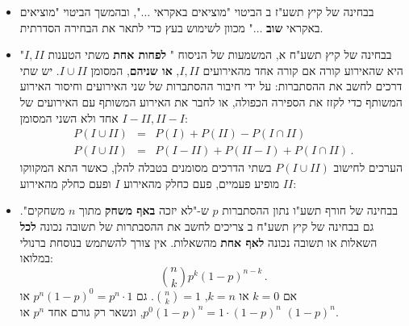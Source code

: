 \documentclass[12pt,a4paper]{article}
\newcommand{\bover}[1]{\bm{\overline{#1}}}
\begin{document}
\begin{itemize}
\item
בבחינה של קיץ תשע"ז ב הביטוי "מוציאים באקראי
$\ldots$",
ובהמשך הביטוי "מוציאים באקראי
\textbf{שוב}
$\ldots$"
מכוון לשימוש בעץ כדי לתאר את הבחירה הסדרתית.


\item
בבחינה של קיץ תשע"ח א, המשמעות של הניסוח "%
\textbf{לפחות אחת}
משתי הטענות 
$I, II$"
היא שהאירוע קורה אם קורה אחד מהאירועים
$I, II$,
\textbf{או שניהם},
המסומן 
$I \cup II$.
יש שתי דרכים לחשב את ההסתברות: על ידי חיבור ההסתברות של שני האירועים וחיסור האירוע המשותף כדי לקזז את הספירה הכפולה, או לחבר את האירוע המשותף עם האירועים של אחד ולא השני המסומן 
$I-II, II-I$:
\begin{eqnarray*}
P(I \cup II) &=& P(I) + P(II) - P(I \cap II)\\
P(I \cup II) &=& P(I-II) + P(II-I) + P(I \cap II)\,.
\end{eqnarray*}
הערכים לחישוב
$P(I \cup II)$
בשתי הדרכים מסומנים בטבלה להלן, כאשר התא המקווקו מופיע פעמיים, פעם כחלק מהאירוע
$I$
ופעם כחלק מהאירוע
$II$:
\begin{center}
\end{center}


\item
בבחינה של חורף תשע"ו נתון ההסתברות
$p$
ש-"לא יזכה
\textbf{באף משחק}
מתוך 
$n$
משחקים". גם בבחינה של  קיץ תשע"ח ב צריכים לחשב את ההסבתרות של תשובה נכונה 
\textbf{לכל}
השאלות או תשובה נכונה
\textbf{לאף אחת}
מהשאלות.  אין צורך להשתמש בנוסחת ברנולי במלואו:
\[
{n \choose k}p^k(1-p)^{n-k}\,.
\]
אם
$k=0$
או
$k=n$,
${n\choose k}=1$.
גם
$p^n(1-p)^0=p^n\cdot 1$
או
$p^0(1-p)^n=1\cdot(1-p)^n$,
ונשאר רק גורם אחד 
$p^n$
או
$(1-p)^n$.


\end{itemize}
\end{document}
